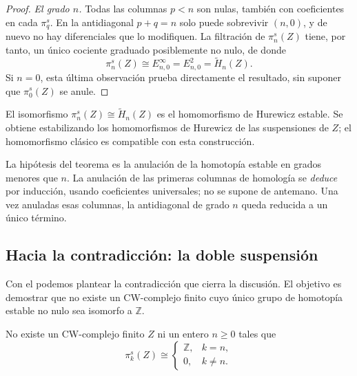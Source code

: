 \begin{proof}
\emph{El grado $n$.} Todas las columnas $p<n$ son nulas, también con coeficientes en cada $\pi_q^s$. En la antidiagonal $p+q=n$ solo puede sobrevivir $(n,0)$, y de nuevo no hay diferenciales que lo modifiquen. La filtración de $\pi_n^s(Z)$ tiene, por tanto, un único cociente graduado posiblemente no nulo, de donde
\[
\pi_n^s(Z)\cong E^\infty_{n,0}=E^2_{n,0}=\tilde H_n(Z).
\]
Si $n=0$, esta última observación prueba directamente el resultado, sin suponer que $\pi_0^s(Z)$ se anule.
\end{proof}

\begin{nota}
   El isomorfismo $\pi_n^s(Z)\cong\tilde H_n(Z)$ es el homomorfismo de Hurewicz estable. Se obtiene estabilizando los homomorfismos de Hurewicz de las suspensiones de $Z$; el homomorfismo clásico es compatible con esta construcción.
\end{nota}

\begin{nota}
   La hipótesis del teorema es la anulación de la homotopía estable en grados menores que $n$. La anulación de las primeras columnas de homología se \emph{deduce} por inducción, usando coeficientes universales; no se supone de antemano. Una vez anuladas esas columnas, la antidiagonal de grado $n$ queda reducida a un único término.
\end{nota}

\subsection{Hacia la contradicción: la doble suspensión}

Con el  podemos plantear la contradicción que cierra la discusión. El objetivo es demostrar que no existe un CW-complejo finito cuyo único grupo de homotopía estable no nulo sea isomorfo a $\mathbb Z$.

\begin{prop}\label{prop:no-existe}
No existe un CW-complejo finito $Z$ ni un entero $n\ge0$ tales que
\[
\pi_k^s(Z)\cong
\begin{cases}
\mathbb Z, & k=n,\\
0, & k\neq n .
\end{cases}
\]
\end{prop}

